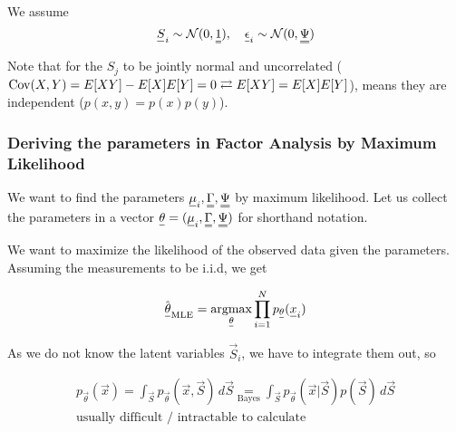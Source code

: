 
We assume
\begin{equation}
    \vec{S}_i \sim \mathcal{N}(0, \mat{1}), \quad \vec{\epsilon}_i \sim \mathcal{N}(0, \mat{\Psi})
\end{equation}

Note that for the $S_j$ to be jointly normal and uncorrelated ($\operatorname{Cov}(X,Y) = E[XY] - E[X] E[Y] = 0 \rightleftarrows E[XY] = E[X]E[Y]$), 
means they are independent ($p(x,y) = p(x) p(y)$).




\subsubsection{Deriving the parameters in Factor Analysis by Maximum Likelihood}
We want to find the parameters $\vec{\mu}_i, \mat{\Gamma}, \mat{\Psi}$ by maximum likelihood.
Let us collect the parameters in a vector $\vec{\theta} = (\vec{\mu}_i, \mat{\Gamma}, \mat{\Psi})$ for 
shorthand notation.

We want to maximize the likelihood of the observed data given the parameters. Assuming the measurements to be i.i.d, we get

\begin{equation}
    \hat{\vec{\theta}}_{\text{MLE}} = \argmax_{\vec{\theta}} \prod_{i=1}^{N} p_{\vec{\theta}}(\vec{x}_i)
\end{equation}

As we do not know the latent variables $\vec{S}_i$, we have to integrate them out, so

\begin{equation}
    \begin{gathered}
        p_\vec{\theta}(\vec{x}) = \int_\vec{S} p_\vec{\theta} (\vec{x}, \vec{S}) \, d\vec{S} \underset{\text{Bayes}}{=} \int_\vec{S} p_\vec{\theta} (\vec{x} | \vec{S}) p(\vec{S}) \, d\vec{S} \\
        \text{usually difficult / intractable to calculate}
    \end{gathered}
\end{equation}

